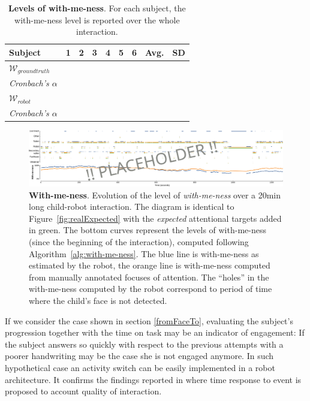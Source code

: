 \documentclass{sig-alternate}
\newcommand{\vs}{\textit{vs.}\xspace}
\begin{document}
\begin{table}[h!]
    \centering
    \caption{\textbf{Levels of with-me-ness}. For each subject, the with-me-ness level is reported over the whole interaction.}
    \begin{tabular}{p{2cm}cccccccc}
        \toprule
        \textbf{Subject} & 1 & 2 & 3 & 4 & 5 & 6 & Avg. & SD \\
        \midrule
        $\mathcal{W}_{groundtruth}$ &  & & & & & & & \\ 
        {\it Cronbach's $\alpha$} &  & & & & & & & \\
        \midrule
        $\mathcal{W}_{robot}$ &  & & & & & & & \\
        {\it Cronbach's $\alpha$} &  & & & & & & & \\
        \bottomrule
    \end{tabular}
    \label{tab:results-with-me-ness}
\end{table}


\begin{figure}
    \centering
    \includegraphics[width=\linewidth]{with-me-ness}
    \caption{\small \textbf{With-me-ness}. Evolution of the level of
    \emph{with-me-ness} over a 20min long child-robot interaction. The diagram
    is identical to Figure~\ref{fig:realExpected} with the \emph{expected}
    attentional targets added in green. The bottom curves represent the levels
    of with-me-ness (since the beginning of the interaction), computed following
    Algorithm~\ref{alg:with-me-ness}. The blue line is with-me-ness as estimated by
    the robot, the orange line is with-me-ness computed from manually annotated
    focuses of attention. The ``holes'' in the with-me-ness computed by the
    robot correspond to period of time where the child's face is not detected.}

    \label{fig:with-me-ness}
\end{figure}

If we consider the case shown in section \ref{fromFaceTo}, evaluating the
subject's progression together with the time on task may be an indicator of
engagement: If the subject answers so quickly with respect to the previous
attempts with a poorer handwriting may be the case she is not engaged anymore.
In such hypothetical case an activity switch can be easily implemented in a
robot architecture. It confirms the findings reported in \cite{anzalone} where
time response to event is proposed to account quality of interaction. 
\end{document}

